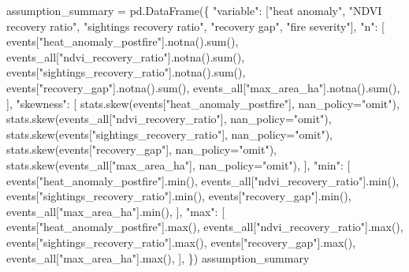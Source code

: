 \documentclass[
  letterpaper,
  DIV=11,
  numbers=noendperiod]{scrartcl}
\newenvironment{Shaded}{\begin{snugshade}}{\end{snugshade}}
\newcommand{\BuiltInTok}[1]{\textcolor[rgb]{0.00,0.23,0.31}{#1}}
\newcommand{\NormalTok}[1]{\textcolor[rgb]{0.00,0.23,0.31}{#1}}
\newcommand{\OperatorTok}[1]{\textcolor[rgb]{0.37,0.37,0.37}{#1}}
\newcommand{\StringTok}[1]{\textcolor[rgb]{0.13,0.47,0.30}{#1}}
\begin{document}
\begin{Shaded}
\begin{Highlighting}[]
\NormalTok{assumption\_summary }\OperatorTok{=}\NormalTok{ pd.DataFrame(\{}
    \StringTok{"variable"}\NormalTok{: [}\StringTok{"heat anomaly"}\NormalTok{, }\StringTok{"NDVI recovery ratio"}\NormalTok{, }\StringTok{"sightings recovery ratio"}\NormalTok{, }\StringTok{"recovery gap"}\NormalTok{, }\StringTok{"fire severity"}\NormalTok{],}
    \StringTok{"n"}\NormalTok{: [}
\NormalTok{        events[}\StringTok{"heat\_anomaly\_postfire"}\NormalTok{].notna().}\BuiltInTok{sum}\NormalTok{(),}
\NormalTok{        events\_all[}\StringTok{"ndvi\_recovery\_ratio"}\NormalTok{].notna().}\BuiltInTok{sum}\NormalTok{(),}
\NormalTok{        events[}\StringTok{"sightings\_recovery\_ratio"}\NormalTok{].notna().}\BuiltInTok{sum}\NormalTok{(),}
\NormalTok{        events[}\StringTok{"recovery\_gap"}\NormalTok{].notna().}\BuiltInTok{sum}\NormalTok{(),}
\NormalTok{        events\_all[}\StringTok{"max\_area\_ha"}\NormalTok{].notna().}\BuiltInTok{sum}\NormalTok{(),}
\NormalTok{    ],}
    \StringTok{"skewness"}\NormalTok{: [}
\NormalTok{        stats.skew(events[}\StringTok{"heat\_anomaly\_postfire"}\NormalTok{], nan\_policy}\OperatorTok{=}\StringTok{"omit"}\NormalTok{),}
\NormalTok{        stats.skew(events\_all[}\StringTok{"ndvi\_recovery\_ratio"}\NormalTok{], nan\_policy}\OperatorTok{=}\StringTok{"omit"}\NormalTok{),}
\NormalTok{        stats.skew(events[}\StringTok{"sightings\_recovery\_ratio"}\NormalTok{], nan\_policy}\OperatorTok{=}\StringTok{"omit"}\NormalTok{),}
\NormalTok{        stats.skew(events[}\StringTok{"recovery\_gap"}\NormalTok{], nan\_policy}\OperatorTok{=}\StringTok{"omit"}\NormalTok{),}
\NormalTok{        stats.skew(events\_all[}\StringTok{"max\_area\_ha"}\NormalTok{], nan\_policy}\OperatorTok{=}\StringTok{"omit"}\NormalTok{),}
\NormalTok{    ],}
    \StringTok{"min"}\NormalTok{: [}
\NormalTok{        events[}\StringTok{"heat\_anomaly\_postfire"}\NormalTok{].}\BuiltInTok{min}\NormalTok{(),}
\NormalTok{        events\_all[}\StringTok{"ndvi\_recovery\_ratio"}\NormalTok{].}\BuiltInTok{min}\NormalTok{(),}
\NormalTok{        events[}\StringTok{"sightings\_recovery\_ratio"}\NormalTok{].}\BuiltInTok{min}\NormalTok{(),}
\NormalTok{        events[}\StringTok{"recovery\_gap"}\NormalTok{].}\BuiltInTok{min}\NormalTok{(),}
\NormalTok{        events\_all[}\StringTok{"max\_area\_ha"}\NormalTok{].}\BuiltInTok{min}\NormalTok{(),}
\NormalTok{    ],}
    \StringTok{"max"}\NormalTok{: [}
\NormalTok{        events[}\StringTok{"heat\_anomaly\_postfire"}\NormalTok{].}\BuiltInTok{max}\NormalTok{(),}
\NormalTok{        events\_all[}\StringTok{"ndvi\_recovery\_ratio"}\NormalTok{].}\BuiltInTok{max}\NormalTok{(),}
\NormalTok{        events[}\StringTok{"sightings\_recovery\_ratio"}\NormalTok{].}\BuiltInTok{max}\NormalTok{(),}
\NormalTok{        events[}\StringTok{"recovery\_gap"}\NormalTok{].}\BuiltInTok{max}\NormalTok{(),}
\NormalTok{        events\_all[}\StringTok{"max\_area\_ha"}\NormalTok{].}\BuiltInTok{max}\NormalTok{(),}
\NormalTok{    ],}
\NormalTok{\})}
\NormalTok{assumption\_summary}
\end{Highlighting}
\end{Shaded}
\end{document}
